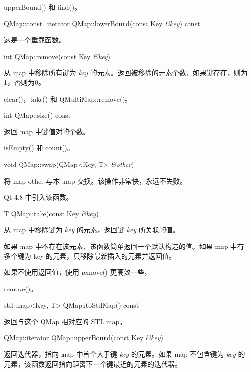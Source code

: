 \begin{seeAlso}
upperBound() 和 find()。
\end{seeAlso}
    

QMap::const\_iterator QMap::lowerBound(const Key \emph{\&key}) const

这是一个重载函数。

\splitLine

int QMap::remove(const Key \emph{\&key})

从 map 中移除所有键为 \emph{key} 的元素。返回被移除的元素个数，如果键存在，则为1，否则为0。

\begin{seeAlso}
clear()，take() 和 QMultiMap::remove()。
\end{seeAlso}

\splitLine

int QMap::size() const

返回 map 中键值对的个数。

\begin{seeAlso}
isEmpty() 和 count()。
\end{seeAlso}
    

\splitLine

void QMap::swap(QMap<Key, T> \emph{\&other})

将 map other 与本 map 交换。该操作非常快，永远不失败。

Qt 4.8 中引入该函数。

\splitLine

T QMap::take(const Key \emph{\&key})

从 map 中移除键为 \emph{key} 的元素，返回键 \emph{key} 所关联的值。

如果 map 中不存在该元素，该函数简单返回一个默认构造的值。如果 map 中有多个键为 key 的元素，只移除最新插入的元素并返回值。

如果不使用返回值，使用 remove() 更高效一些。

\begin{seeAlso}
remove()。
\end{seeAlso}

\splitLine

std::map<Key, T> QMap::toStdMap() const

返回与这个 QMap 相对应的 STL map。

\splitLine

QMap::iterator QMap::upperBound(const Key \emph{\&key})

返回迭代器，指向 map 中首个大于键 \emph{key} 的元素。如果 map 不包含键为 \emph{key} 的元素，该函数返回指向距离下一个键最近的元素的迭代器。

